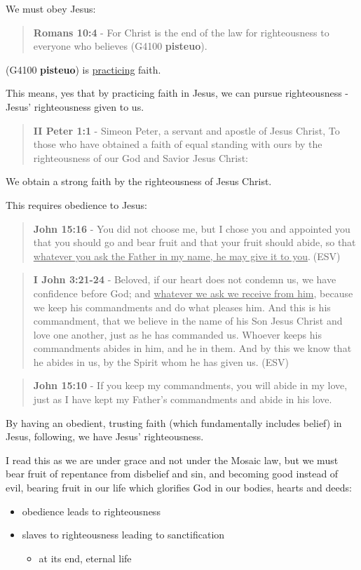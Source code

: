 \documentclass[11pt]{article}
\begin{document}
We must obey Jesus:

\begin{quote}
\textbf{Romans 10:4} - For Christ is the end of the law for righteousness to everyone who believes (G4100 \textbf{pisteuo}).
\end{quote}

(G4100 \textbf{pisteuo}) is \uline{practicing} faith.

This means, yes that by practicing faith in Jesus, we can pursue righteousness - Jesus' righteousness given to us.

\begin{quote}
\textbf{II Peter 1:1} - Simeon Peter, a servant and apostle of Jesus Christ, To those who have obtained a faith of equal standing with ours by the righteousness of our God and Savior Jesus Christ:
\end{quote}

We obtain a strong faith by the righteousness of Jesus Christ.

This requires obedience to Jesus:

\begin{quote}
\textbf{John 15:16} - You did not choose me, but I chose you and appointed you that you should go and bear fruit and that your fruit should abide, so that \uline{whatever you ask the Father in my name, he may give it to you}.􀀂(ESV)
\end{quote}

\begin{quote}
\textbf{I John 3:21-24} - Beloved, if our heart does not condemn us, we have confidence before God; and \uline{whatever we ask we receive from him}, because we keep his commandments and do what pleases him. And this is his commandment, that we believe in the name of his Son Jesus Christ and love one another, just as he has commanded us. Whoever keeps his commandments abides in him, and he in them. And by this we know that he abides in us, by the Spirit whom he has given us. (ESV)
\end{quote}

\begin{quote}
\textbf{John 15:10} - If you keep my commandments, you will abide in my love, just as I have kept my Father's commandments and abide in his love.
\end{quote}

By having an obedient, trusting faith (which fundamentally includes belief) in Jesus, following, we have Jesus' righteousness.

I read this as we are under grace and not
under the Mosaic law, but we must bear fruit
of repentance from disbelief and sin, and
becoming good instead of evil, bearing fruit
in our life which glorifies God in our bodies,
hearts and deeds:
\begin{itemize}
\item obedience leads to righteousness
\item slaves to righteousness leading to sanctification
\begin{itemize}
\item at its end, eternal life
\end{itemize}
\end{itemize}
\end{document}
